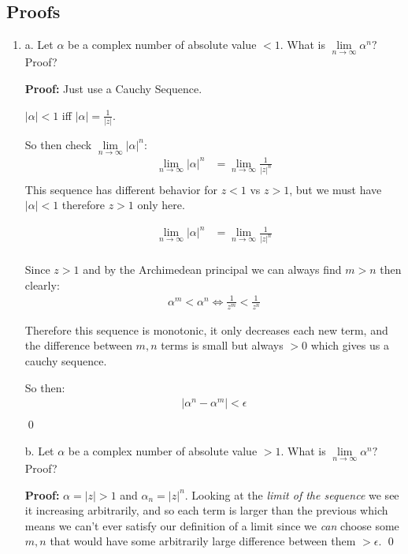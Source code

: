 \subsection{Proofs}
\begin{enumerate}
	\item
	      \subitem a. Let $\alpha$ be a complex number of absolute value $< 1.$
	      What is $\lim\limits_{n \to \infty} \alpha^n ?$ Proof?

	      \textbf{Proof:}
	      Just use a Cauchy Sequence.

	      $|\alpha| < 1$ iff $ |\alpha| = \frac{1}{|z|}.$

	      So then check $\lim\limits_{n \to \infty} |\alpha|^n$:
	      \begin{align*}
		      \lim\limits_{n \to \infty} |\alpha|^n & = \lim\limits_{n \to \infty} \frac{1}{|z|^n} \\
	      \end{align*}
	      This sequence has different behavior for $z < 1$ vs $z > 1$, but we must have $|\alpha| < 1$ therefore $z > 1$ only here.

	      \begin{align*}
		      \lim\limits_{n \to \infty} |\alpha|^n & = \lim\limits_{n \to \infty} \frac{1}{|z|^n} \\
	      \end{align*}

	      Since $z > 1$ and by the Archimedean principal we can always find $m > n$
	      then clearly:
	      \begin{align*}
		      \alpha^m < \alpha^n \iff \frac{1}{z^m} < \frac{1}{z^n}
	      \end{align*}

	      Therefore this sequence is monotonic, it only decreases each new term, and the difference between $m, n$ terms is
	      small but always $> 0$ which gives us a cauchy sequence.

	      So then:
	      \begin{align*}
		      |\alpha^n - \alpha^m| < \epsilon \\
	      \end{align*} \qed

	      \subitem b. Let $\alpha$ be a complex number of absolute value $> 1.$
	      What is $\lim\limits_{n \to \infty} \alpha^n ?$ Proof?

	      \textbf{Proof:}
	      $ \alpha = |z| > 1$ and $\alpha_n = |z|^n.$
	      Looking at the \textit{limit of the sequence} we see it increasing arbitrarily, and so each
	      term is larger than the previous which means we can't ever satisfy our definition of a limit
	      since we \textit{can} choose some $m, n$ that would have some arbitrarily large difference between
	      them $> \epsilon.$ \qed


\end{enumerate}
